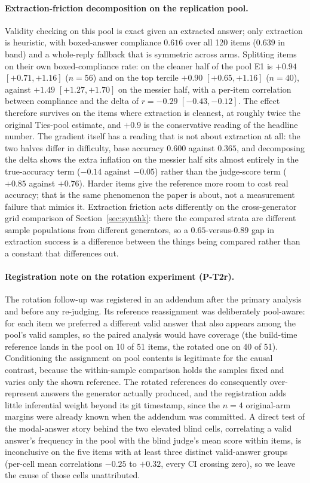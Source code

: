 \documentclass[11pt]{article}
\begin{document}
\paragraph{Extraction-friction decomposition on the replication pool.}
Validity checking on this pool is exact given an extracted answer; only extraction is heuristic, with boxed-answer compliance $0.616$ over all 120 items ($0.639$ in band) and a whole-reply fallback that is symmetric across arms.
Splitting items on their own boxed-compliance rate: on the cleaner half of the pool E1 is $+0.94$ $[+0.71, +1.16]$ ($n{=}56$) and on the top tercile $+0.90$ $[+0.65, +1.16]$ ($n{=}40$), against $+1.49$ $[+1.27, +1.70]$ on the messier half, with a per-item correlation between compliance and the delta of $r{=}-0.29$ $[-0.43, -0.12]$.
The effect therefore survives on the items where extraction is cleanest, at roughly twice the original Ties-pool estimate, and $+0.9$ is the conservative reading of the headline number.
The gradient itself has a reading that is not about extraction at all: the two halves differ in difficulty, base accuracy $0.600$ against $0.365$, and decomposing the delta shows the extra inflation on the messier half sits almost entirely in the true-accuracy term ($-0.14$ against $-0.05$) rather than the judge-score term ($+0.85$ against $+0.76$).
Harder items give the reference more room to cost real accuracy; that is the same phenomenon the paper is about, not a measurement failure that mimics it.
Extraction friction acts differently on the cross-generator grid comparison of Section~\ref{sec:synthk}: there the compared strata are different sample populations from different generators, so a $0.65$-versus-$0.89$ gap in extraction success is a difference between the things being compared rather than a constant that differences out.

\paragraph{Registration note on the rotation experiment (P-T2r).}
The rotation follow-up was registered in an addendum after the primary analysis and before any re-judging.
Its reference reassignment was deliberately pool-aware: for each item we preferred a different valid answer that also appears among the pool's valid samples, so the paired analysis would have coverage (the build-time reference lands in the pool on 10 of 51 items, the rotated one on 40 of 51).
Conditioning the assignment on pool contents is legitimate for the causal contrast, because the within-sample comparison holds the samples fixed and varies only the shown reference.
The rotated references do consequently over-represent answers the generator actually produced, and the registration adds little inferential weight beyond its git timestamp, since the $n{=}4$ original-arm margins were already known when the addendum was committed.
A direct test of the modal-answer story behind the two elevated blind cells, correlating a valid answer's frequency in the pool with the blind judge's mean score within items, is inconclusive on the five items with at least three distinct valid-answer groups (per-cell mean correlations $-0.25$ to $+0.32$, every CI crossing zero), so we leave the cause of those cells unattributed.
\end{document}

